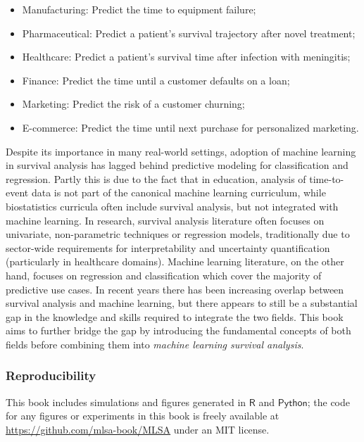 \documentclass[
  letterpaper,
  krantz2]{style/krantz}
\providecommand{\tightlist}{%
  \setlength{\itemsep}{0pt}\setlength{\parskip}{0pt}}
\begin{document}
\begin{itemize}
\tightlist
\item
  Manufacturing: Predict the time to equipment failure;
\item
  Pharmaceutical: Predict a patient's survival trajectory after novel
  treatment;
\item
  Healthcare: Predict a patient's survival time after infection with
  meningitis;
\item
  Finance: Predict the time until a customer defaults on a loan;
\item
  Marketing: Predict the risk of a customer churning;
\item
  E-commerce: Predict the time until next purchase for personalized
  marketing.
\end{itemize}

Despite its importance in many real-world settings, adoption of machine
learning in survival analysis has lagged behind predictive modeling for
classification and regression. Partly this is due to the fact that in
education, analysis of time-to-event data is not part of the canonical
machine learning curriculum, while biostatistics curricula often include
survival analysis, but not integrated with machine learning. In
research, survival analysis literature often focuses on univariate,
non-parametric techniques or regression models, traditionally due to
sector-wide requirements for interpretability and uncertainty
quantification (particularly in healthcare domains). Machine learning
literature, on the other hand, focuses on regression and classification
which cover the majority of predictive use cases. In recent years there
has been increasing overlap between survival analysis and machine
learning, but there appears to still be a substantial gap in the
knowledge and skills required to integrate the two fields. This book
aims to further bridge the gap by introducing the fundamental concepts
of both fields before combining them into \emph{machine learning
survival analysis}.

\subsubsection*{Reproducibility}

This book includes simulations and figures generated in \(\textsf{R}\)
and \(\textsf{Python}\); the code for any figures or experiments in this
book is freely available at \url{https://github.com/mlsa-book/MLSA}
under an MIT license.
\end{document}
